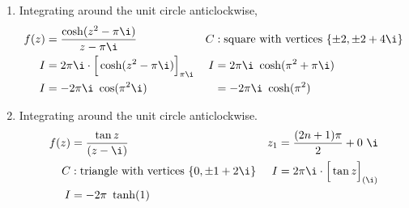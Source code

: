 \begin{enumerate}
    \item Integrating around the unit circle anticlockwise,
          \begin{align}
              f(z) & = \frac{\cosh(z^2 - \pi \i)}{z - \pi \i}                 &
              C    & : \text{square with vertices}\ \{\pm 2, \pm 2+4\i\}        \\
              I    & = 2\pi \i \cdot \Big[ \cosh(z^2 - \pi \i) \Big]_{\pi \i} &
              I    & = 2\pi \i\ \cosh(\pi^2 + \pi \i)                           \\
              I    & = -2\pi\i\ \cos(\pi^2\i)                                 &
                   & = -2\pi\i\ \cosh(\pi^2)
          \end{align}

    \item Integrating around the unit circle anticlockwise.
          \begin{align}
              f(z) & = \frac{\tan z}{(z - \i)}                           &
              z_1  & = \frac{(2n+1)\pi}{2} + 0\ \i                         \\
              C    & : \text{triangle with vertices}\ \{0, \pm 1 + 2\i\} &
              I    & = 2\pi \i \cdot \Big[ \tan z \Big]_{(\i)}             \\
              I    & = -2\pi\ \tanh(1)
          \end{align}


\end{enumerate}
